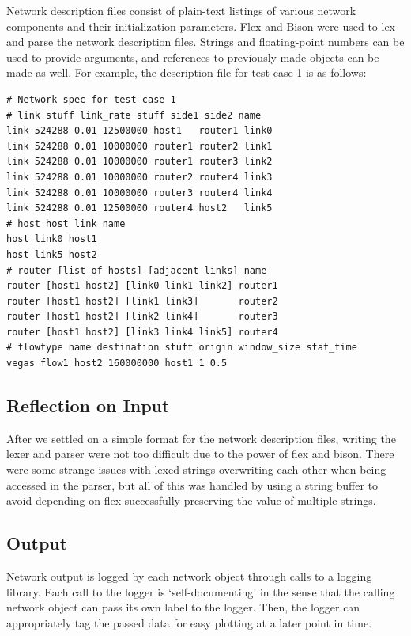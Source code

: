 \documentclass[12pt]{article}
\begin{document}
Network description files consist of plain-text listings of various network components and their initialization parameters. Flex and Bison were used to lex and parse the network description files. Strings and floating-point numbers can be used to provide arguments, and references to previously-made objects can be made as well. For example, the description file for test case 1 is as follows:
\begin{verbatim}
# Network spec for test case 1
# link stuff link_rate stuff side1 side2 name
link 524288 0.01 12500000 host1   router1 link0
link 524288 0.01 10000000 router1 router2 link1
link 524288 0.01 10000000 router1 router3 link2
link 524288 0.01 10000000 router2 router4 link3
link 524288 0.01 10000000 router3 router4 link4
link 524288 0.01 12500000 router4 host2   link5
# host host_link name
host link0 host1
host link5 host2
# router [list of hosts] [adjacent links] name
router [host1 host2] [link0 link1 link2] router1
router [host1 host2] [link1 link3]       router2
router [host1 host2] [link2 link4]       router3
router [host1 host2] [link3 link4 link5] router4
# flowtype name destination stuff origin window_size stat_time
vegas flow1 host2 160000000 host1 1 0.5
\end{verbatim}

\subsection*{Reflection on Input}

After we settled on a simple format for the network description files, writing the lexer and parser were not too difficult due to the power of flex and bison. There were some strange issues with lexed strings overwriting each other when being accessed in the parser, but all of this was handled by using a string buffer to avoid depending on flex successfully preserving the value of multiple strings.



\subsection{Output}

Network output is logged by each network object through calls to a logging library. Each call to the logger is ‘self-documenting’ in the sense that the calling network object can pass its own label to the logger. Then, the logger can appropriately tag the passed data for easy plotting at a later point in time.
\end{document}
